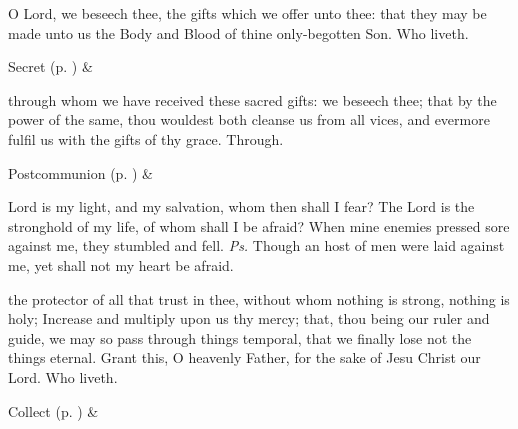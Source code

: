
\secret\label{TrinityIIISecret}
 O Lord, we beseech thee, the gifts which we offer unto thee: that they may be made unto us the Body and Blood of thine only-begotten Son. Who liveth.

\begin{rubric}
     Secret  (p. \pageref{SPSaints}) \&  
\end{rubric}


\postcommunion\label{TrinityIIIPostcommunion}
 through whom we have received these sacred gifts: we beseech thee; that by the power of the same, thou wouldest both cleanse us from all vices, and evermore fulfil us with the gifts of thy grace. Through.

\begin{rubric}
     Postcommunion  (p. \pageref{SPSaints}) \&  
\end{rubric}


\clearpage
{}


\introit
{} Lord is my light, and my salvation, whom then shall I fear? The Lord is the stronghold of my life, of whom shall I be afraid? When mine enemies pressed sore against me, they stumbled and fell. \textit{Ps.} Though an host of men were laid against me, yet shall not my heart be afraid.

\collect
{} the protector of all that trust in thee, without whom nothing is strong, nothing is holy; Increase and multiply upon us thy mercy; that, thou being our ruler and guide, we may so pass through things temporal, that we finally lose not the things eternal. Grant this, O heavenly Father, for the sake of Jesu Christ our Lord. Who liveth.
\begin{rubric}
     Collect  (p. \pageref{SPSaints}) \&  
\end{rubric}

